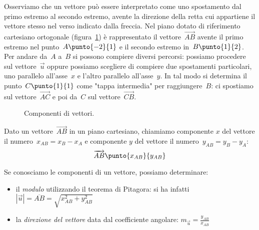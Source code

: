 Osserviamo che un vettore può essere interpretato come uno spostamento dal 
primo estremo al secondo estremo, avente la direzione della retta cui appartiene 
il vettore stesso nel
verso indicato dalla freccia.
Nel piano dotato di riferimento cartesiano ortogonale (figura~\ref{fig:F.4}) 
è rappresentato il vettore~$\overrightarrow{AB}$ avente 
il primo estremo nel punto~$A\punto{-2}{1}$ e
il secondo estremo in~$B\punto{1}{2}$. 
Per andare da~$A$ a~$B$ si possono compiere diversi percorsi: 
possiamo procedere sul vettore~$\vec{u}$ oppure possiamo scegliere di compiere 
due spostamenti particolari,
uno parallelo all'asse~$x$ e l'altro parallelo all'asse~$y$. In tal modo si 
determina il punto~$C\punto{1}{1}$ come "tappa intermedia" per 
raggiungere~$B$:
ci spostiamo sul vettore~$\overrightarrow{AC}$ e poi da~$C$ sul 
vettore~$\overrightarrow{CB}$.

\begin{inaccessibleblock}
 \begin{figure}[b]
\centering
\scalebox{.8}{}
\caption{Componenti di vettori.}\label{fig:F.4}
\end{figure}
\end{inaccessibleblock}


\begin{definizione}
Dato un vettore~$\overrightarrow{AB}$ in un piano cartesiano, chiamiamo 
componente \(x\) del vettore il numero~\(x_{AB} = x_B - x_A\) e 
componente \(y\) del vettore il numero~\(y_{AB} = y_B - y_A\):
\[\overrightarrow{AB}\punto{x_{AB}}{y_{AB}}\]
\end{definizione}

Se conosciamo le componenti di un vettore, possiamo determinare:
\begin{itemize} [noitemsep]
 \item 
il \emph{modulo} utilizzando il teorema di Pitagora: 
si ha infatti~$|\vec{u}|=\overline{AB}=\sqrt{x_{AB}^2+y_{AB}^2}$
 \item 
la \emph{direzione del vettore} data dal coefficiente angolare:
$m_{\vec{u}}=\frac{y_{AB}}{x_{AB}}$
\end{itemize}

